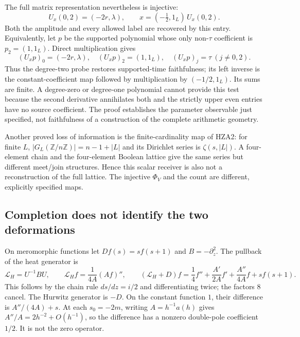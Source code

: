 \documentclass[11pt]{article}
\theoremstyle{definition}
\begin{document}
The full matrix representation nevertheless is injective:
\begin{equation}\tag{CFD16}
 U_x(0,2)=(-2r,\lambda),\qquad
 x=(-\tfrac12,1_L)\,U_x(0,2).
\end{equation}
Both the amplitude and every allowed label are recovered by this
entry. Equivalently, let $p$ be the supported polynomial whose
only non-$\tau$ coefficient is $p_2=(1,1_L)$. Direct multiplication
gives
\begin{equation}\tag{CFD17}
 (U_xp)_0=(-2r,\lambda),\quad (U_xp)_2=(1,1_L),\quad
 (U_xp)_j=\tau\ (j\ne0,2).
\end{equation}
Thus the degree-two probe restores supported-time faithfulness;
its left inverse is the constant-coefficient map followed by
multiplication by $(-1/2,1_L)$. Its sums are finite. A degree-zero
or degree-one polynomial cannot provide this test because the
second derivative annihilates both and the strictly upper even
entries have no source coefficient. The proof establishes the
parameter observable just specified, not faithfulness of a
construction of the complete arithmetic geometry.

Another proved loss of information is the finite-cardinality map
of HZA2: for finite $L$, $|G_L(\mathbb Z/n\mathbb Z)|=n-1+|L|$
and its Dirichlet series is $\zeta(s,|L|)$. A four-element chain
and the four-element Boolean lattice give the same series but
different meet/join structures. Hence this scalar receiver is
also not a reconstruction of the full lattice. The injective
$\Phi_V$ and the count are different, explicitly specified maps.

\subsection{Completion does not identify the two deformations}

On meromorphic functions let $Df(s)=s f(s+1)$ and
$B=-\partial_z^2$. The pullback of the heat generator is
\begin{equation}\tag{CFD18}
 \mathcal L_H=U^{-1}BU,\qquad
 \mathcal L_H f=\frac1{4A}(Af)'',\qquad
 (\mathcal L_H+D)f=
 \frac14 f''+\frac{A'}{2A}f'
             +\frac{A''}{4A}f+s f(s+1).
\end{equation}
This follows by the chain rule $ds/dz=i/2$ and differentiating
twice; the factors $8$ cancel. The Hurwitz generator is $-D$.
On the constant function $1$, their difference is
$A''/(4A)+s$. At each $s_0=-2m$, writing $A=h^{-1}a(h)$ gives
$A''/A=2h^{-2}+O(h^{-1})$, so the difference has a nonzero
double-pole coefficient $1/2$. It is not the zero operator.
\end{document}

